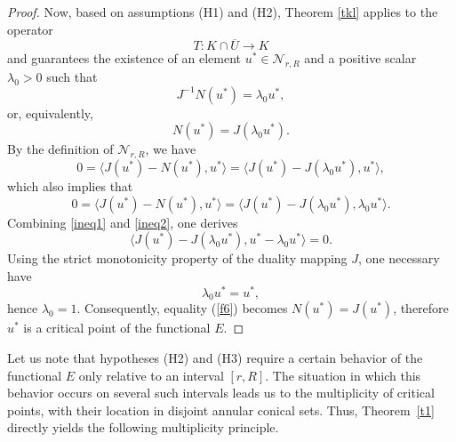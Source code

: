 \documentclass{birkjour}
\theoremstyle{definition}
\theoremstyle{remark}
\numberwithin{equation}{section}
\begin{document}
\begin{proof}
Now, based on assumptions (H1) and (H2), Theorem \ref{tkl} applies to the
operator
\begin{equation*}
T\colon K\cap \overline{U}\rightarrow K
\end{equation*}%
and guarantees the existence of an element $u^{\ast }\in \mathcal{N}_{r,R}$
and a positive scalar $\lambda _{0}>0$ such that
\begin{equation*}
J^{-1}N\left( u^{\ast }\right) =\lambda _{0}u^{\ast },
\end{equation*}%
or, equivalently,
\begin{equation}
N\left( u^{\ast }\right) =J(\lambda _{0}u^{\ast }).  \label{f6}
\end{equation}%
By the definition of $\mathcal{N}_{r,R}$, we have
\begin{equation}
0=\langle J\left( u^{\ast }\right) -N\left( u^{\ast }\right) ,u^{\ast
}\rangle =\langle J\left( u^{\ast }\right) -J(\lambda _{0}u^{\ast }),u^{\ast
}\rangle ,  \label{ineq1}
\end{equation}%
which also implies that
\begin{equation}
0=\langle J\left( u^{\ast }\right) -N\left( u^{\ast }\right) ,u^{\ast
}\rangle =\langle J\left( u^{\ast }\right) -J(\lambda _{0}u^{\ast }),\lambda
_{0}u^{\ast }\rangle .  \label{ineq2}
\end{equation}%
Combining \eqref{ineq1} and \eqref{ineq2}, one derives
\begin{equation*}
\langle J\left( u^{\ast }\right) -J(\lambda _{0}u^{\ast }),u^{\ast }-\lambda
_{0}u^{\ast }\rangle =0.
\end{equation*}%
Using the strict monotonicity property of the duality mapping $J$, one
necessary have
\begin{equation*}
\lambda _{0}u^{\ast }=u^{\ast },
\end{equation*}%
hence $\lambda _{0}=1$. Consequently, equality (\ref{f6}) becomes $N\left(
u^{\ast }\right) =J(u^{\ast })$, therefore $u^{\ast }$ is a critical point
of the functional $E$.
\end{proof}

Let us note that hypotheses (H2) and (H3) require a certain behavior of the
functional $E$ only relative to an interval $[r,R]$. The situation in which
this behavior occurs on several such intervals leads us to the multiplicity
of critical points, with their location in disjoint annular conical sets.
Thus, Theorem~\ref{t1} directly yields the following multiplicity principle.
\end{document}
